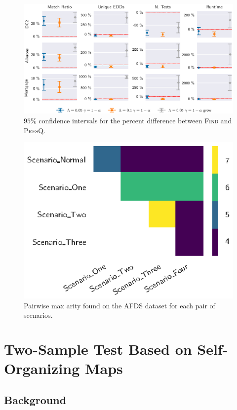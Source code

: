 \documentclass[10pt]{beamer}
\newcommand{\PresQ}[0]{\textsc{PresQ}\xspace}
\begin{document}
\begin{frame}{}
\begin{figure}
    \centering
    \includegraphics[width=\textwidth]{all.eps}
    \caption{$95\%$ confidence intervals for the percent difference
    between \textsc{Find} and \PresQ.}
\end{figure}
\end{frame}

\begin{frame}{}
\begin{figure}
    \centering
    \includegraphics{afds.eps}
    \caption{Pairwise max arity found on the AFDS dataset for each pair of scenarios.}
\end{figure}
\end{frame}

\section{Two-Sample Test Based on Self-Organizing Maps}

\subsection{Background}
\end{document}
